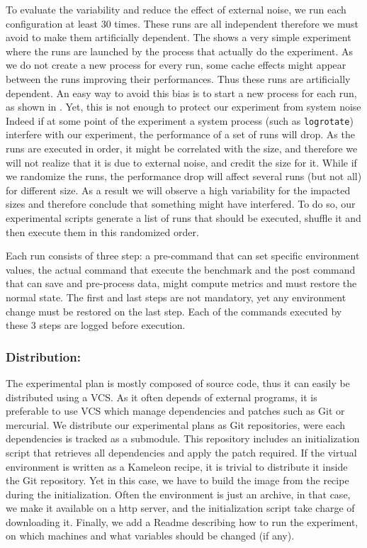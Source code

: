To evaluate the variability and reduce the effect of external noise, we run each configuration at least $30$ times.
These runs are all independent therefore we must avoid to make them artificially dependent.
The  shows a very simple experiment where the runs are launched by the process that actually do the experiment.
As we do not create a new process for every run, some cache effects might appear between the runs improving their performances.
Thus these runs are artificially dependent.
An easy way to avoid this bias is to start a new process for each run, as shown in .
Yet, this is not enough to protect our experiment from system noise
Indeed if at some point of the experiment a system process (such as \texttt{logrotate}) interfere with our experiment, the performance of a set of runs will drop.
As the runs are executed in order, it might be correlated with the size, and therefore we will not realize that it is due to external noise, and credit the size for it.
While if we randomize the runs, the performance drop will affect several runs (but not all) for different size.
As a result we will observe a high variability for the impacted sizes and therefore conclude that something might have interfered.
To do so, our experimental scripts generate a list of runs that should be executed, shuffle it and then execute them in this randomized order.

Each run consists of three step: a pre-command that can set specific environment values, the actual command that execute the benchmark and the post command that can save and pre-process data, might compute metrics and must restore the normal state.
The first and last steps are not mandatory, yet any environment change must be restored on the last step.
Each of the commands executed by these 3 steps are logged before execution.

\subsubsection{Distribution:}

The experimental plan is mostly composed of source code, thus it can easily be distributed using a \gls{VCS}.
As it often depends of external programs, it is preferable to use \gls{VCS} which manage dependencies and patches such as \gls{Git} or mercurial.
We distribute our experimental plans as \gls{Git} repositories, were each dependencies is tracked as a submodule.
This repository includes an initialization script that retrieves all dependencies and apply the patch required.
If the virtual environment is written as a \gls{Kameleon} recipe, it is trivial to distribute it inside the \gls{Git} repository.
Yet in this case, we have to build the image from the recipe during the initialization.
Often the environment is just an archive, in that case, we make it available on a http server, and the initialization script take charge of downloading it.
Finally, we add a Readme describing how to run the experiment, on which machines and what variables should be changed (if any).

